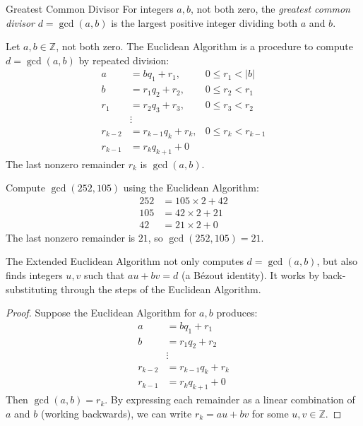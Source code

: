











\begin{define}{Greatest Common Divisor}
  For integers $a,b$, not both zero, the \emph{greatest common divisor} $d=\gcd(a,b)$ is the largest positive integer dividing both $a$ and $b$.
\end{define}


\begin{theorem}
Let $a, b \in \mathbb{Z}$, not both zero. The Euclidean Algorithm is a procedure to compute $d = \gcd(a, b)$ by repeated division:
\begin{align*}
  a &= bq_1 + r_1, & 0 \leq r_1 < |b| \\
  b &= r_1 q_2 + r_2, & 0 \leq r_2 < r_1 \\
  r_1 &= r_2 q_3 + r_3, & 0 \leq r_3 < r_2 \\
  &\vdots \\
  r_{k-2} &= r_{k-1} q_k + r_k, & 0 \leq r_k < r_{k-1} \\
  r_{k-1} &= r_k q_{k+1} + 0
\end{align*}
The last nonzero remainder $r_k$ is $\gcd(a, b)$.
\end{theorem}

\begin{example}
Compute $\gcd(252, 105)$ using the Euclidean Algorithm:
\begin{align*}
  252 &= 105 \times 2 + 42 \\
  105 &= 42 \times 2 + 21 \\
  42 &= 21 \times 2 + 0
\end{align*}
The last nonzero remainder is $21$, so $\gcd(252, 105) = 21$.
\end{example}

\begin{theorem}
The Extended Euclidean Algorithm not only computes $d = \gcd(a, b)$, but also finds integers $u, v$ such that $au + bv = d$ (a Bézout identity).
It works by back-substituting through the steps of the Euclidean Algorithm.
\end{theorem}

\begin{proof}
Suppose the Euclidean Algorithm for $a, b$ produces:
\begin{align*}
  a &= bq_1 + r_1 \\
  b &= r_1 q_2 + r_2 \\
  &\vdots \\
  r_{k-2} &= r_{k-1} q_k + r_k \\
  r_{k-1} &= r_k q_{k+1} + 0
\end{align*}
Then $\gcd(a, b) = r_k$. By expressing each remainder as a linear combination of $a$ and $b$ (working backwards), we can write $r_k = au + bv$ for some $u, v \in \mathbb{Z}$.
\end{proof}

